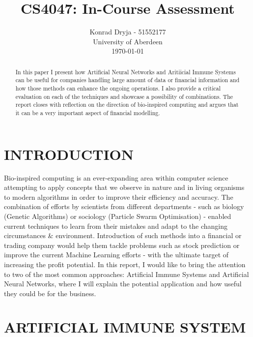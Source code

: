 \documentclass[letterpaper, 10 pt, conference]{ieeeconf}  %
\title{\LARGE \bf
CS4047: In-Course Assessment
}
\author{Konrad Dryja - 51552177 \\
  University of Aberdeen \\
  \today%
}
\begin{document}
\maketitle
\thispagestyle{empty}
\pagestyle{empty}


\begin{abstract}

  In this paper I present how Artificial Neural Networks and Aritiicial Immune Systems can be useful for companies handling large amount of data or financial information and how those methods can enhance the ongoing operations. I also provide a critical evaluation on each of the techniques and showcase a possibility of combinations. The report closes with reflection on the direction of bio-inspired computing and argues that it can be a very important aspect of financial modelling.

\end{abstract}


\section{INTRODUCTION}

Bio-inspired computing is an ever-expanding area within computer science attempting to apply concepts that we observe in nature and in living organisms to modern algorithms in order to improve their efficiency and accuracy. The combination of efforts by scientists from different departments - such as biology (Genetic Algorithms) or sociology (Particle Swarm Optimisation) - enabled current techniques to learn from their mistakes and adapt to the changing circumstances \& environment. Introduction of such methods into a financial or trading company would help them tackle problems such as stock prediction \cite{gunasekaran2011evaluation} or improve the current Machine Learning efforts - with the ultimate target of increasing the profit potential. In this report, I would like to bring the attention to two of the most common approaches: Artificial Immune Systems and Artificial Neural Networks, where I will explain the potential application and how useful they could be for the business.

\section{ARTIFICIAL IMMUNE SYSTEM}
\end{document}

